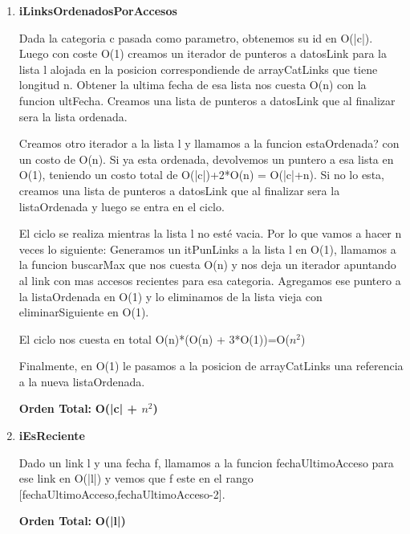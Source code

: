 \begin{enumerate}
\item\textbf{iLinksOrdenadosPorAccesos}
\par Dada la categoria c pasada como parametro, obtenemos su id en O(|c|). Luego con coste O(1) creamos un iterador de punteros a datosLink para la lista l alojada en la posicion correspondiende de arrayCatLinks que tiene longitud n. Obtener la ultima fecha de esa lista nos cuesta O(n) con la funcion ultFecha. Creamos una lista de punteros a datosLink que al finalizar sera la lista ordenada.
\par Creamos otro iterador a la lista l y llamamos a la funcion estaOrdenada? con un costo de O(n). Si ya esta ordenada, devolvemos un puntero a esa lista en O(1), teniendo un costo total de O(|c|)+2*O(n) = O(|c|+n). Si no lo esta, creamos una lista de punteros a datosLink que al finalizar sera la listaOrdenada y luego se entra en el ciclo.
\par El ciclo se realiza mientras la lista l no esté vacia. Por lo que vamos a hacer n veces lo siguiente: Generamos un itPunLinks a la lista l en O(1), llamamos a la funcion buscarMax que nos cuesta O(n) y nos deja un iterador apuntando al link con mas accesos recientes para esa categoria. Agregamos ese puntero a la listaOrdenada en O(1) y lo eliminamos de la lista vieja con eliminarSiguiente en O(1).
\par El ciclo nos cuesta en total O(n)*(O(n) + 3*O(1))=O($n^2$)
\par Finalmente, en O(1) le pasamos a la posicion de arrayCatLinks una referencia a la nueva listaOrdenada.
\par\textbf{Orden Total:} \textbf{O(|c| + $n^2$)}

\item\textbf{iEsReciente}
\par Dado un link l y una fecha f, llamamos a la funcion fechaUltimoAcceso para ese link en O(|l|) y vemos que f este en el rango [fechaUltimoAcceso,fechaUltimoAcceso-2].
\par\textbf{Orden Total:} \textbf{O(|l|)}

\end{enumerate}



